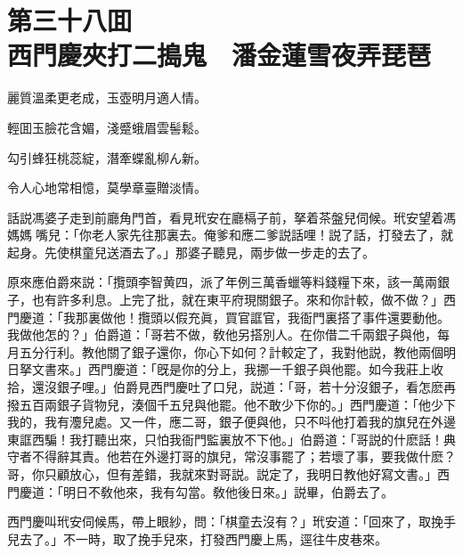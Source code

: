 
\chapter*{第三十八囬　\\西門慶夾打二搗鬼　潘金蓮雪夜弄琵琶}


\begin{myquote}
麗質溫柔更老成，玉壺明月適人情。

輕囬玉臉花含媚，淺蹙蛾眉雲髻鬆。

勾引蜂狂桃蕊綻，潛牽蝶亂柳ん新。

令人心地常相憶，莫學章臺贈淡情。
\end{myquote}

話説馮婆子走到前廳角門首，看見玳安在廳槅子前，拏着茶盤兒伺候。玳安望着馮媽媽𢫓嘴兒：「你老人家先往那裏去。俺爹和應二爹説話哩！説了話，打發去了，就起身。先使棋童兒送酒去了。」那婆子聽見，兩步做一步走的去了。

原來應伯爵來説：「攬頭李智黄四，派了年例三萬香蠟等料錢糧下來，該一萬兩銀子，也有許多利息。上完了批，就在東平府現關銀子。來和你計較，做不做？」西門慶道：「我那裏做他！攬頭以假充眞，買官誆官，我衙門裏搭了事件還要動他。我做他怎的？」伯爵道：「哥若不做，敎他另搭別人。在你借二千兩銀子與他，每月五分行利。教他關了銀子還你，你心下如何？計較定了，我對他説，教他兩個明日拏文書來。」西門慶道：「旣是你的分上，我挪一千銀子與他罷。如今我莊上收拾，還沒銀子哩。」伯爵見西門慶吐了口兒，説道：「哥，若十分沒銀子，看怎麽再撥五百兩銀子貨物兒，湊個千五兒與他罷。他不敢少下你的。」西門慶道：「他少下我的，我有灋兒處。又一件，應二哥，銀子便與他，只不呌他打着我的旗兒在外邊東誆西騙！我打聽出來，只怕我衙門監裏放不下他。」伯爵道：「哥説的什麽話！典守者不得辭其責。他若在外邊打哥的旗兒，常沒事罷了；若壞了事，要我做什麽？哥，你只顧放心，但有差錯，我就來對哥説。説定了，我明日教他好寫文書。」西門慶道：「明日不敎他來，我有勾當。敎他後日來。」説畢，伯爵去了。

西門慶叫玳安伺候馬，帶上眼紗，問：「棋童去沒有？」玳安道：「回來了，取挽手兒去了。」不一時，取了挽手兒來，打發西門慶上馬，逕往牛皮巷來。

